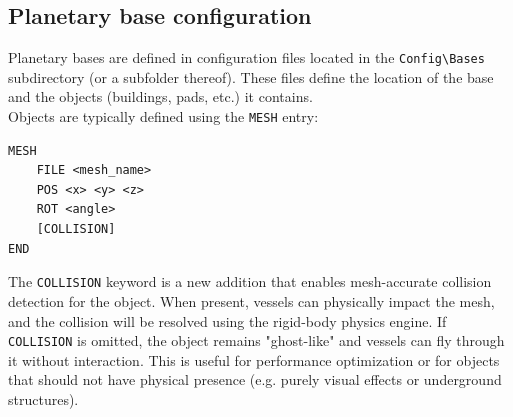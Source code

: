 \documentclass[Orbiter User Manual.tex]{subfiles}
\begin{document}
\subsection{Planetary base configuration}
Planetary bases are defined in configuration files located in the \texttt{Config\textbackslash Bases} subdirectory (or a subfolder thereof). These files define the location of the base and the objects (buildings, pads, etc.) it contains.\\
Objects are typically defined using the \texttt{MESH} entry:

\begin{lstlisting}[language=OSFS]
MESH
	FILE <mesh_name>
	POS <x> <y> <z>
	ROT <angle>
	[COLLISION]
END
\end{lstlisting}

\noindent
The \texttt{COLLISION} keyword is a new addition that enables mesh-accurate collision detection for the object. When present, vessels can physically impact the mesh, and the collision will be resolved using the rigid-body physics engine. If \texttt{COLLISION} is omitted, the object remains "ghost-like" and vessels can fly through it without interaction. This is useful for performance optimization or for objects that should not have physical presence (e.g. purely visual effects or underground structures).
\end{document}
